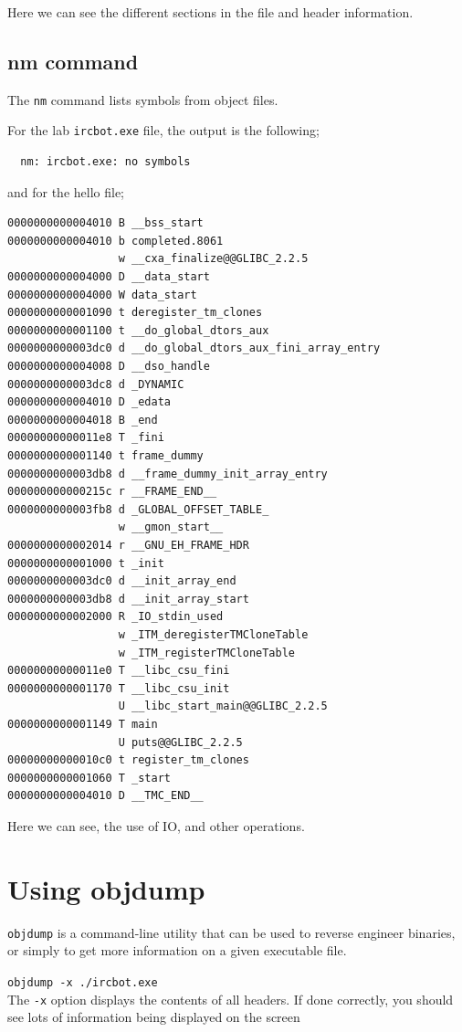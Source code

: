 \documentclass[]{project_plan}
\begin{document}
Here we can see the different sections in the file and header information.

\subsection{nm command}

The \lstinline|nm| command lists symbols from object files.

For the lab
\lstinline|ircbot.exe| file, the output is the following;
\begin{lstlisting}
  nm: ircbot.exe: no symbols
\end{lstlisting}

and for the hello file;
\begin{lstlisting}[basicstyle=\tiny]
  0000000000004010 B __bss_start
0000000000004010 b completed.8061
                 w __cxa_finalize@@GLIBC_2.2.5
0000000000004000 D __data_start
0000000000004000 W data_start
0000000000001090 t deregister_tm_clones
0000000000001100 t __do_global_dtors_aux
0000000000003dc0 d __do_global_dtors_aux_fini_array_entry
0000000000004008 D __dso_handle
0000000000003dc8 d _DYNAMIC
0000000000004010 D _edata
0000000000004018 B _end
00000000000011e8 T _fini
0000000000001140 t frame_dummy
0000000000003db8 d __frame_dummy_init_array_entry
000000000000215c r __FRAME_END__
0000000000003fb8 d _GLOBAL_OFFSET_TABLE_
                 w __gmon_start__
0000000000002014 r __GNU_EH_FRAME_HDR
0000000000001000 t _init
0000000000003dc0 d __init_array_end
0000000000003db8 d __init_array_start
0000000000002000 R _IO_stdin_used
                 w _ITM_deregisterTMCloneTable
                 w _ITM_registerTMCloneTable
00000000000011e0 T __libc_csu_fini
0000000000001170 T __libc_csu_init
                 U __libc_start_main@@GLIBC_2.2.5
0000000000001149 T main
                 U puts@@GLIBC_2.2.5
00000000000010c0 t register_tm_clones
0000000000001060 T _start
0000000000004010 D __TMC_END__
\end{lstlisting}

Here we can see, the use of IO, and other operations.

\section{Using objdump}

\lstinline|objdump| is a command-line
utility that can be used to reverse engineer binaries, or simply to get more
information on a given executable file.

\lstinline|objdump -x ./ircbot.exe|\\
The \lstinline|-x| option displays the contents of all headers. If done correctly, you
should see lots of information being displayed on the screen
\end{document}
